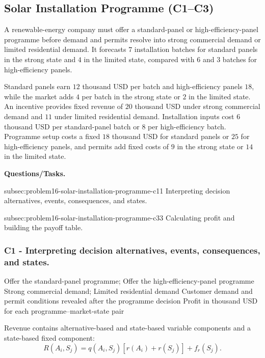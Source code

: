 	\subsection{Solar Installation Programme (C1--C3)}
	\label{sec:problem16-solar-installation-programme-c1-c3}

	A renewable-energy company must offer a standard-panel or high-efficiency-panel programme before demand and permits resolve into strong commercial demand or limited residential demand. It forecasts \(7\) installation batches for standard panels in the strong state and \(4\) in the limited state, compared with \(6\) and \(3\) batches for high-efficiency panels.

	Standard panels earn \(12\) thousand USD per batch and high-efficiency panels \(18\), while the market adds \(4\) per batch in the strong state or \(2\) in the limited state. An incentive provides fixed revenue of \(20\) thousand USD under strong commercial demand and \(11\) under limited residential demand. Installation inputs cost \(6\) thousand USD per standard-panel batch or \(8\) per high-efficiency batch. Programme setup costs a fixed \(18\) thousand USD for standard panels or \(25\) for high-efficiency panels, and permits add fixed costs of \(9\) in the strong state or \(14\) in the limited state.

	\textbf{Questions/Tasks.}
	\begin{enumerate}
		\CriterionTask
		{subsec:problem16-solar-installation-programme-c1}{1}
		{Interpreting decision alternatives, events, consequences, and states.}

		\CriterionTask
		{subsec:problem16-solar-installation-programme-c3}{3}
		{Calculating profit and building the payoff table.}
	\end{enumerate}

	\subsubsection*{C1 - Interpreting decision alternatives, events, consequences, and states.}
	\label{subsec:problem16-solar-installation-programme-c1}

	\DecisionElementsTable
	{Offer the standard-panel programme; Offer the high-efficiency-panel programme}
	{Strong commercial demand; Limited residential demand}
	{Customer demand and permit conditions revealed after the programme decision}
	{Profit in thousand USD for each programme--market-state pair}

	Revenue contains alternative-based and state-based variable components and
	a state-based fixed component:
	\[
	R(A_i,S_j)
	=
	q(A_i,S_j)
	\left[
	r(A_i)+r(S_j)
	\right]
	+
	f_r(S_j).
	\]

